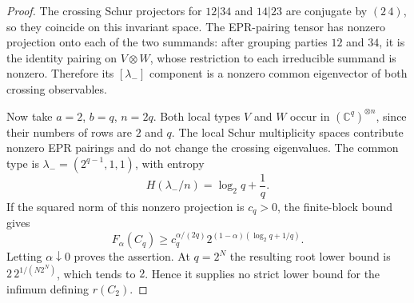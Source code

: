 \begin{proof}
The crossing Schur projectors for $12|34$ and $14|23$ are
conjugate by $(2\,4)$, so they coincide on this invariant space.
The EPR-pairing tensor has nonzero projection onto each of the two
summands: after grouping parties $12$ and $34$, it is the identity
pairing on $V\otimes W$, whose restriction to each irreducible
summand is nonzero. Therefore its $[\lambda_-]$ component is a
nonzero common eigenvector of both crossing observables.

Now take $a=2$, $b=q$, $n=2q$. Both local types $V$ and $W$
occur in $(\mathbb C^q)^{\otimes n}$, since their numbers of rows
are $2$ and $q$. The local Schur multiplicity spaces contribute
nonzero EPR pairings and do not change the crossing eigenvalues.
The common type is $\lambda_-=(2^{q-1},1,1)$, with entropy
\[
 H(\lambda_-/n)=\log_2q+\frac1q.
\]
If the squared norm of this nonzero projection is $c_q>0$, the
finite-block bound gives
\[
 F_\alpha(C_q)\geq c_q^{\alpha/(2q)}
 2^{(1-\alpha)(\log_2q+1/q)}.
\]
Letting $\alpha\downarrow0$ proves the assertion. At $q=2^N$
the resulting root lower bound is
$2\,2^{1/(N2^N)}$, which tends to $2$. Hence it supplies no
strict lower bound for the infimum defining $r(C_2)$.
\end{proof}

